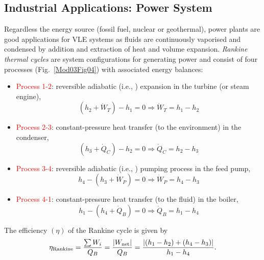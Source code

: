    \subsection{Industrial Applications: Power System}
Regardless the energy source (fossil fuel, nuclear or geothermal), power plants are good applications for VLE systems as fluids are continuously vaporised and condensed by addition and extraction of heat and volume expansion. {\it Rankine thermal cycles} are system configurations for generating power and consist of four processes (Fig.~\ref{Mod03Fig04}) with associated energy balances:
     \begin{itemize}
      \item \textcolor{red}{Process 1-2}: reversible adiabatic (i.e., ) expansion in the turbine (or steam engine),
            \begin{displaymath}
               \left(h_{2} + \dot{W}_{T}\right)-h_{1} = 0 \Rightarrow \dot{W}_{T} = h_{1}-h_{2}
            \end{displaymath}
      \item \textcolor{red}{Process 2-3}: constant-pressure heat transfer (to the environment) in the condenser,
            \begin{displaymath}
               \left(h_{3} + \dot{Q}_{C}\right)-h_{2} = 0 \Rightarrow \dot{Q}_{C} = h_{2}-h_{3}
            \end{displaymath}
      \item \textcolor{red}{Process 3-4}: reversible adiabatic (i.e., ) pumping process in the feed pump,
            \begin{displaymath}
               h_{4} - \left(h_{3} + \dot{W}_{P}\right) = 0 \Rightarrow \dot{W}_{P} = h_{4}-h_{3}
            \end{displaymath}
      \item \textcolor{red}{Process 4-1}: constant-pressure heat transfer (to the fluid) in the boiler,
            \begin{displaymath}
               h_{1} - \left(h_{4} + \dot{Q}_{B}\right) = 0 \Rightarrow \dot{Q}_{B} = h_{1}-h_{4}
            \end{displaymath} 
     \end{itemize}
     The efficiency $\left(\eta\right)$ of the Rankine cycle is given by
           \begin{displaymath}
               \eta_{\text{Rankine}} = \displaystyle\frac{\sum W_{i}}{Q_{B}} = \displaystyle\frac{\left|W_{\text{net}}\right|}{Q_{B}} = \displaystyle\frac{\left|\left(h_{1}-h_{2}\right)+\left(h_{4}-h_{3}\right)\right|}{h_{1}-h_{4}}.
           \end{displaymath}
